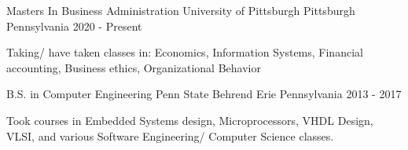 


\begin{cventries}

\cventry
{Masters In Business Administration} %
{University of Pittsburgh} %
{Pittsburgh Pennsylvania} %
{2020 - Present} %
{ %
\begin{cvitems}
\item 
{
    Taking/ have taken classes in: Economics, Information Systems, Financial accounting, Business ethics, Organizational Behavior 
}
\end{cvitems}
}

\cventry
{B.S. in Computer Engineering} %
{Penn State Behrend} %
{Erie Pennsylvania} %
{2013 - 2017} %
{ %
\begin{cvitems}
\item 
{
    Took courses in Embedded Systems design, Microprocessors, VHDL Design, VLSI, and various Software Engineering/ Computer Science classes.
}
\end{cvitems}
}


\end{cventries}